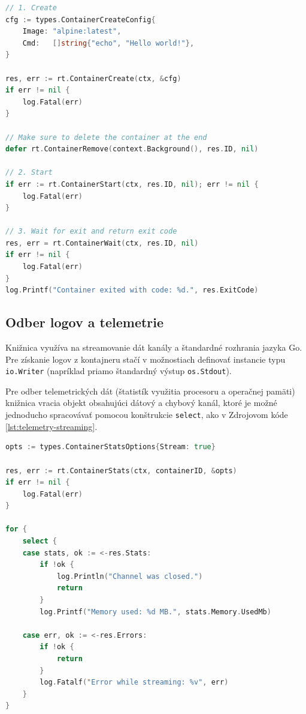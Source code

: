 \documentclass[
 program=infpvs,
  language=slovak,
  figures=false,
  tables=false,
  sourcecodes,
  glossaries,
  index
]{kidiplom}
\begin{document}
{\begin{lstlisting}[language=Go, caption={Ukážka správy životného cyklu kontajneru.}, label={lst:lifecycle-management}]
// 1. Create
cfg := types.ContainerCreateConfig{
    Image: "alpine:latest",
    Cmd:   []string{"echo", "Hello world!"},
}

res, err := rt.ContainerCreate(ctx, &cfg)
if err != nil {
    log.Fatal(err)
}

// Make sure to delete the container at the end
defer rt.ContainerRemove(context.Background(), res.ID, nil)

// 2. Start
if err := rt.ContainerStart(ctx, res.ID, nil); err != nil {
    log.Fatal(err)
}

// 3. Wait for exit and return exit code
res, err = rt.ContainerWait(ctx, res.ID, nil)
if err != nil {
    log.Fatal(err)
}
log.Printf("Container exited with code: %d.", res.ExitCode)
\end{lstlisting}



\subsection{Odber logov a telemetrie}  \label{sec:docs-logy-telemetria}
Knižnica využíva na streamovanie dát kanály a štandardné rozhrania jazyka Go. Pre získanie logov z kontajneru stačí v možnostiach definovať instancie typu \texttt{io.Writer} (napríklad priamo štandardný výstup \texttt{os.Stdout}). 

Pre odber telemetrických dát (štatistík využitia procesoru a operačnej pamäti) knižnica vracia objekt obsahujúci dátový a chybový kanál, ktoré je možné jednoducho spracovávať pomocou konštrukcie \texttt{select}, ako v Zdrojovom kóde \ref{lst:telemetry-streaming}.

\begin{lstlisting}[language=Go, caption={Ukážka čítania telemetrie v reálnom čase.}, label={lst:telemetry-streaming}]
opts := types.ContainerStatsOptions{Stream: true}

res, err := rt.ContainerStats(ctx, containerID, &opts)
if err != nil {
    log.Fatal(err)
}

for {
    select {
    case stats, ok := <-res.Stats:
        if !ok {
            log.Println("Channel was closed.")
            return
        }
        log.Printf("Memory used: %d MB.", stats.Memory.UsedMb)

    case err, ok := <-res.Errors:
        if !ok {
            return
        }
        log.Fatalf("Error while streaming: %v", err)
    }
}
\end{lstlisting}



}
\end{document}
